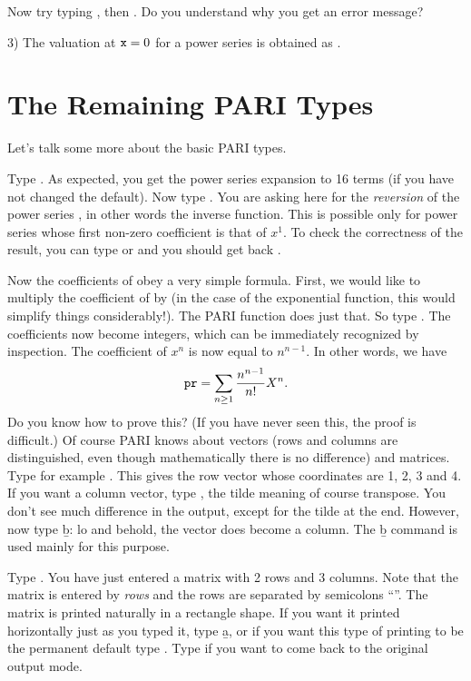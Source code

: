 Now try typing , then
. Do you understand why you get an error message?

3) The valuation at ${\tt x} = 0$ for a power series  is obtained
as .

\section{The Remaining PARI Types}
Let's talk some more about the basic PARI types.

Type . As expected, you get the power series expansion
to 16 terms (if you have not changed the default). Now type
. You are asking here for the {\it reversion\/} of the
power series , in other words the inverse function. This is possible
only for power series whose first non-zero coefficient is that of $x^1$.  To
check the correctness of the result, you can type  or
 and you should get back .

Now the coefficients of  obey a very simple formula. First, we would
like to multiply the coefficient of  by  (in the case of
the exponential function, this would simplify things considerably!). The PARI
function  does just that. So type .
The coefficients now become integers, which can be immediately recognized by
inspection. The coefficient of $x^n$ is now equal to
$n^{n-1}$. In other words, we have
%
$${\tt pr} = \sum_{n\ge1}{{n^{n-1}}\over{n!}} X^{n}.$$
%
Do you know how to prove this? (If you have never seen this, the proof is
difficult.)
\smallskip
%
Of course PARI knows about vectors (rows and columns are distinguished, even
though mathematically there is no difference) and matrices. Type for example
\kbd{[1,2,3,4]}. This gives the row vector whose coordinates are 1, 2, 3 and
4.  If you want a column vector, type \kbd{[1,2,3,4]\til}, the tilde meaning
of course transpose. You don't see much difference in the output, except for
the tilde at the end. However, now type \b{b}: lo and behold, the vector does
become a column. The \b{b} command is used mainly for this purpose.

Type . You have just entered a matrix with 2 rows and
3 columns. Note that the matrix is entered by {\it rows\/} and the rows are
separated by semicolons ``\kbd{;}''. The matrix is printed naturally in a
rectangle shape. If you want it printed horizontally just as you typed it,
type \b{a}, or if you want this type of printing to be the permanent default
type . Type  if you want to
come back to the original output mode.

